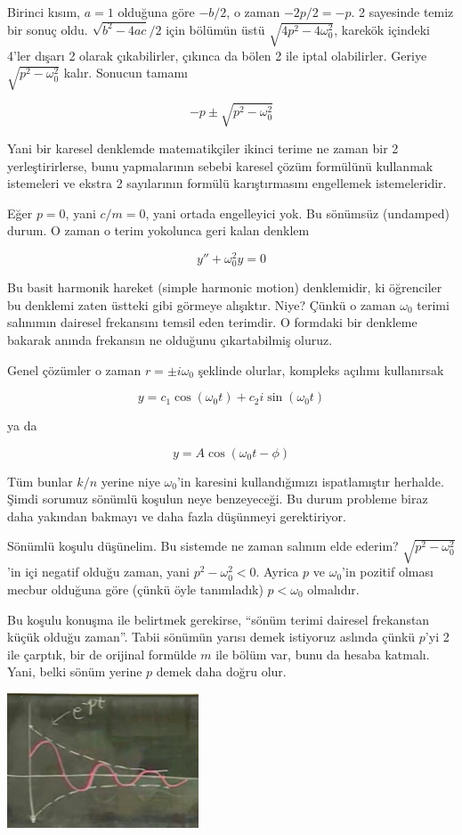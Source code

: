 \documentclass[12pt,fleqn]{article}\usepackage{../../common}
\begin{document}
Birinci kısım, $a=1$ olduğuna göre $-b / 2$, o zaman $-2p / 2 = -p$. 2 
sayesinde temiz bir sonuç oldu. $\sqrt{b^2-4ac} / 2$ için bölümün üstü 
$\sqrt{4p^2 - 4\omega_0^2}$, karekök içindeki 4'ler dışarı 2 olarak 
çıkabilirler, çıkınca da bölen 2 ile iptal olabilirler. Geriye $\sqrt{p^2 -
  \omega_0^2}$ kalır. Sonucun 
tamamı

$$ -p \pm \sqrt{p^2 - \omega_0^2} $$

Yani bir karesel denklemde matematikçiler ikinci terime ne zaman bir 2
yerleştirirlerse, bunu yapmalarının sebebi karesel çözüm formülünü
kullanmak istemeleri ve ekstra 2 sayılarının formülü karıştırmasını
engellemek istemeleridir.  

Eğer $p=0$, yani $c/m = 0$, yani ortada engelleyici yok. Bu sönümsüz
(undamped) durum. O zaman o terim yokolunca geri kalan denklem

$$ y'' + \omega_0^2y = 0 $$

Bu basit harmonik hareket (simple harmonic motion) denklemidir, ki
öğrenciler bu denklemi zaten üstteki gibi görmeye alışıktır. Niye? Çünkü o
zaman $\omega_0$ terimi salınımın dairesel frekansını temsil eden
terimdir. O formdaki bir denkleme bakarak anında frekansın ne olduğunu
çıkartabilmiş oluruz. 

Genel çözümler o zaman $r=\pm i \omega_0$ şeklinde olurlar, kompleks
açılımı kullanırsak 

$$ y = c_1 \cos(\omega_0 t) + c_2 i\sin (\omega_0 t) $$

ya da

$$ y = A \cos(\omega_0 t - \phi) $$

Tüm bunlar $k/n$ yerine niye $\omega_0$'in karesini kullandığımızı
ispatlamıştır herhalde. Şimdi sorumuz sönümlü koşulun neye benzeyeceği. Bu
durum probleme biraz daha yakından bakmayı ve daha fazla düşünmeyi
gerektiriyor.

Sönümlü koşulu düşünelim. Bu sistemde ne zaman salınım elde ederim?
$\sqrt{p^2 - \omega_0^2}$'in içi negatif olduğu zaman, yani $p^2 -
\omega_0^2 < 0$. Ayrica $p$ ve $\omega_0$'in pozitif olması mecbur olduğuna
göre (çünkü öyle tanımladık) $p < \omega_0$ olmalıdır.

Bu koşulu konuşma ile belirtmek gerekirse, ``sönüm terimi dairesel
frekanstan küçük olduğu zaman''. Tabii sönümün yarısı demek istiyoruz
aslında çünkü $p$'yi 2 ile çarptık, bir de orijinal formülde $m$ ile bölüm
var, bunu da hesaba katmalı. Yani, belki sönüm yerine $p$ demek daha
doğru olur.

\includegraphics[height=4cm]{10_2.png}
\end{document}
